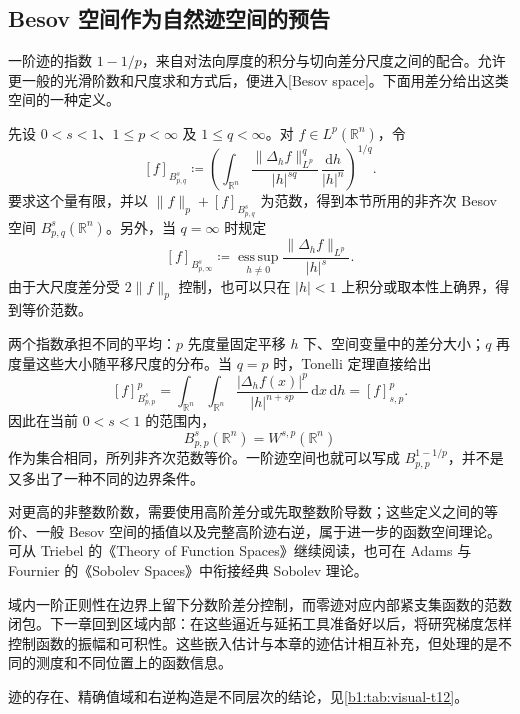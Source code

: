 \subsection{Besov 空间作为自然迹空间的预告}
\label{b1:subsec:230403}

一阶迹的指数 \(1-1/p\)，来自对法向厚度的积分与切向差分尺度之间的配合。允许更一般的光滑阶数和尺度求和方式后，便进入[Besov space]。下面用差分给出这类空间的一种定义。

\ProseParagraphBreak

先设 \(0<s<1\)、\(1\le p<\infty\) 及 \(1\le q<\infty\)。对 \(f\in L^p(\mathbb R^n)\)，令
\[
 [f]_{B^s_{p,q}}
 \coloneqq\left(
   \int_{\mathbb R^n}
    \frac{\|\Delta_hf\|_{L^p}^q}{|h|^{sq}}
    \,\frac{\mathrm dh}{|h|^n}
   \right)^{1/q}.
\]
要求这个量有限，并以 \(\|f\|_p+[f]_{B^s_{p,q}}\) 为范数，得到本节所用的非齐次 Besov 空间 \(B^s_{p,q}(\mathbb R^n)\)。另外，当 \(q=\infty\) 时规定
\[
 [f]_{B^s_{p,\infty}}
 \coloneqq\operatorname*{ess\,sup}_{h\ne0}
       \frac{\|\Delta_hf\|_{L^p}}{|h|^s}.
\]
由于大尺度差分受 \(2\|f\|_p\) 控制，也可以只在 \(|h|<1\) 上积分或取本性上确界，得到等价范数。

\ProseParagraphBreak

两个指数承担不同的平均：\(p\) 先度量固定平移 \(h\) 下、空间变量中的差分大小；\(q\) 再度量这些大小随平移尺度的分布。当 \(q=p\) 时，Tonelli 定理直接给出
\[
 [f]_{B^s_{p,p}}^p
 =\int_{\mathbb R^n}\int_{\mathbb R^n}
       \frac{|\Delta_hf(x)|^p}{|h|^{n+sp}}\,\mathrm dx\,\mathrm dh
 =[f]_{s,p}^p.
\]
因此在当前 \(0<s<1\) 的范围内，
\[
 B^s_{p,p}(\mathbb R^n)=W^{s,p}(\mathbb R^n)
\]
作为集合相同，所列非齐次范数等价。一阶迹空间也就可以写成 \(B^{1-1/p}_{p,p}\)，并不是又多出了一种不同的边界条件。

\ProseParagraphBreak

对更高的非整数阶数，需要使用高阶差分或先取整数阶导数；这些定义之间的等价、一般 Besov 空间的插值以及完整高阶迹右逆，属于进一步的函数空间理论。可从 Triebel 的《Theory of Function Spaces》\cite{Triebel1983Theory}继续阅读，也可在 Adams 与 Fournier 的《Sobolev Spaces》\cite{Adams2003Sobolev}中衔接经典 Sobolev 理论。

\ProseParagraphBreak

域内一阶正则性在边界上留下分数阶差分控制，而零迹对应内部紧支集函数的范数闭包。下一章回到区域内部：在这些逼近与延拓工具准备好以后，将研究梯度怎样控制函数的振幅和可积性。这些嵌入估计与本章的迹估计相互补充，但处理的是不同的测度和不同位置上的函数信息。

迹的存在、精确值域和右逆构造是不同层次的结论，见\cref{b1:tab:visual-t12}。

